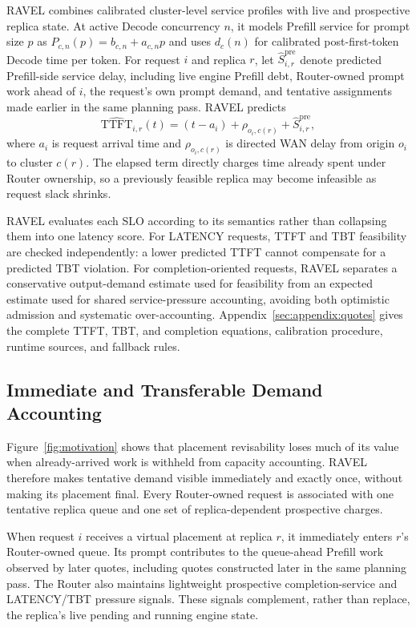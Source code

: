 RAVEL combines calibrated cluster-level service profiles with live and
prospective replica state.
At active Decode concurrency $n$, it models Prefill service for prompt size
$p$ as
$P_{c,n}(p)=b_{c,n}+a_{c,n}p$ and uses $d_c(n)$ for calibrated
post-first-token Decode time per token.
For request $i$ and replica $r$, let
$\widehat{S}^{\mathrm{pre}}_{i,r}$ denote predicted Prefill-side service delay,
including live engine Prefill debt, Router-owned prompt work ahead of $i$, the
request's own prompt demand, and tentative assignments made earlier in the
same planning pass.
RAVEL predicts
\begin{equation}
    \widehat{\mathrm{TTFT}}_{i,r}(t)
    =
    (t-a_i)
    +
    \rho_{o_i,c(r)}
    +
    \widehat{S}^{\mathrm{pre}}_{i,r},
    \label{eq:ravel-ttft}
\end{equation}
where $a_i$ is request arrival time and
$\rho_{o_i,c(r)}$ is directed WAN delay from origin $o_i$ to cluster $c(r)$.
The elapsed term directly charges time already spent under Router ownership,
so a previously feasible replica may become infeasible as request slack
shrinks.

RAVEL evaluates each SLO according to its semantics rather than collapsing
them into one latency score.
For LATENCY requests, TTFT and TBT feasibility are checked independently:
a lower predicted TTFT cannot compensate for a predicted TBT violation.
For completion-oriented requests, RAVEL separates a conservative
output-demand estimate used for feasibility from an expected estimate used
for shared service-pressure accounting, avoiding both optimistic admission
and systematic over-accounting.
Appendix~\ref{sec:appendix:quotes} gives the complete TTFT, TBT, and completion
equations, calibration procedure, runtime sources, and fallback rules.


\subsection{Immediate and Transferable Demand Accounting}
\label{sec:design:accounting}

Figure~\ref{fig:motivation} shows that placement revisability loses much of its
value when already-arrived work is withheld from capacity accounting.
RAVEL therefore makes tentative demand visible immediately and exactly once,
without making its placement final.
Every Router-owned request is associated with one tentative replica queue and
one set of replica-dependent prospective charges.

When request $i$ receives a virtual placement at replica $r$, it immediately
enters $r$'s Router-owned queue.
Its prompt contributes to the queue-ahead Prefill work observed by later
quotes, including quotes constructed later in the same planning pass.
The Router also maintains lightweight prospective completion-service and
LATENCY/TBT pressure signals.
These signals complement, rather than replace, the replica's live pending and
running engine state.

